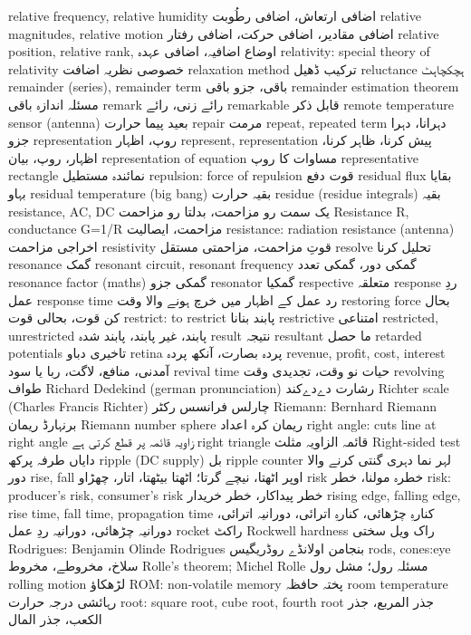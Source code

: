 relative frequency, relative humidity	اضافی ارتعاش، اضافی رطُوبت
relative magnitudes, relative motion	اضافی مقادیر، اضافی حرکت، اضافی رفتار
relative position, relative rank,	اوضاع اضافیہ، اضافی عہدہ
relativity: special theory of relativity	خصوصی نظریہ اضافت
relaxation method	ترکیب ڈھیل
reluctance	 ہچکچاہٹ
remainder (series), remainder term	باقی، جزو باقی
remainder estimation theorem	مسئلہ اندازہ باقی
remark	رائے زنی، رائے
remarkable	قابل ذکر
remote temperature sensor (antenna)	بعید پیما حرارت
repair	مرمت
repeat, repeated term	دہرانا، دہرا جزو
representation	روپ، اظہار
represent, representation	پیش کرنا، ظاہر کرنا، اظہار، روپ، بیان
representation of equation	مساوات کا روپ
representative rectangle	نمائندہ مستطیل
repulsion: force of repulsion	قوت دفع
residual flux	بقایا بہاو
residual temperature (big bang)	بقیہ حرارت
residue (residue integrals)	بقیہ
resistance, AC, DC	یک سمت رو مزاحمت، بدلتا رو مزاحمت
Resistance R, conductance G=1/R	مزاحمت، ایصالیت
resistance: radiation resistance (antenna)	اخراجی مزاحمت
resistivity	قوتِ مزاحمت، مزاحمتی مستقل
resolve	تحلیل کرنا
resonance	گمک
resonant circuit, resonant frequency	گمکی دور، گمکی تعدد
resonance factor (maths)	گمکی جزو
resonator	گمکیا
respective	متعلقہ
response	ردِ عمل
response time	رد عمل کے اظہار میں خرچ ہونے والا وقت
restoring force	بحال کن قوت، بحالی قوت
restrict: to restrict	پابند بنانا
restrictive	امتناعی
restricted, unrestricted	پابند، غیر پابند، پابند شدہ
result	نتیجہ
resultant	ما حصل
retarded potentials	تاخیری دباو
retina	پردہ بصارت، آنکھ پردہ
revenue, profit, cost, interest	آمدنی، منافع، لاگت، ربا یا سود
revival time	حیات نو وقت، تجدیدی وقت
revolving	طواف
Richard Dedekind (german pronunciation)	رشارت  دےدےکند
Richter scale (Charles Francis Richter)	چارلس فرانسس رکٹر
Riemann: Bernhard Riemann	برنہارڈ ریمان
Riemann number sphere	ریمان کرہ اعداد
right angle: cuts line  at right angle	زاویہ قائمہ پر قطع کرتی ہے
right triangle	قائمہ الزاویہ مثلث
Right-sided test	دایاں طرفہ پرکھ
ripple (DC supply)	بل
ripple counter	لہر نما دہری گنتی کرنے والا دور
rise, fall	اوپر اٹھتا، نیچے گرتا؛ اٹھتا بیٹھتا، اتار، چھڑاو
risk	خطرہ مولنا، خطر
risk: producer's risk, consumer's risk	خطر پیداکار، خطر خریدار
rising edge, falling edge, rise time, fall time, propagation time	کنارہِ چڑھائی، کنارہِ اترائی، دورانیہ اترائی، دورانیہ چڑھائی، دورانیہ ردِ عمل
rocket	راکٹ
Rockwell hardness	راک ویل سختی
Rodrigues: Benjamin Olinde Rodrigues	بنجامن اولانڈے روڈریگیس
rods, cones:eye	سلاخ، مخروطے، مخروط
Rolle's theorem; Michel Rolle	مسئلہ رول؛ مشل رول
rolling motion	لڑھکاؤ
ROM: non-volatile memory	پختہ حافظہ
room temperature	رہائشی درجہ حرارت
root: square root, cube root, fourth root	جذر المربع، جذر الکعب، جذر المال
